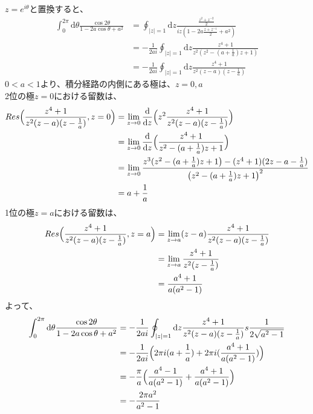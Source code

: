 \documentclass[dvipdfmx,a4paper]{jsarticle}
\begin{document}
\subsection{}
$z = e^{i\theta}$と置換すると、
\begin{align*}
\int_0^{2\pi}\mathrm{d}\theta \frac{\cos{2\theta}}{1-2a\cos{\theta}+a^2} &= \oint_{|z|=1}\mathrm{d}z\frac{\frac{z^2+z^{-2}}{2}}{iz(1-2a\frac{z + z^{-1}}{2}+a^2)}\\
&= -\frac{1}{2ai}\oint_{|z|=1}\mathrm{d}z\frac{z^4+1}{z^2(z^2 - (a + \frac{1}{a})z +1)}\\
&= -\frac{1}{2ai}\oint_{|z|=1}\mathrm{d}z\frac{z^4+1}{z^2(z-a)(z-\frac{1}{a})}
\end{align*}
$0<a<1$より、積分経路の内側にある極は、$z = 0,a$\\
2位の極$z = 0$における留数は、
\begin{align*}
Res\Bigl(\frac{z^4+1}{z^2(z-a)(z-\frac{1}{a})}, z = 0\Bigr) &= \lim_{z \to 0}\frac{\mathrm{d}}{\mathrm{d}z}\Bigl(z^2\frac{z^4+1}{z^2(z-a)(z-\frac{1}{a})}\Bigr)\\
&= \lim_{z \to 0}\frac{\mathrm{d}}{\mathrm{d}z}\Bigl(\frac{z^4+1}{z^2 - (a + \frac{1}{a})z +1}\Bigr)\\
&= \lim_{z \to 0}\frac{z^3(z^2 - (a + \frac{1}{a})z +1\bigr) - (z^4+1)(2z - a - \frac{1}{a})}{\bigl(z^2 - (a + \frac{1}{a})z +1\bigr)^2}\\
&= a + \frac{1}{a}
\end{align*}
1位の極$z = a$における留数は、
\begin{align*}
Res\Bigl(\frac{z^4+1}{z^2(z-a)(z-\frac{1}{a})}, z = a\Bigr) &= \lim_{z \to a}(z-a)\frac{z^4+1}{z^2(z-a)(z-\frac{1}{a})}\\
&= \lim_{z \to a}\frac{z^4+1}{z^2(z-\frac{1}{a})}\\
&= \frac{a^4+1}{a(a^2-1)}
\end{align*}
よって、
\begin{align*}
\int_0^{2\pi}\mathrm{d}\theta \frac{\cos{2\theta}}{1-2a\cos{\theta}+a^2} &= -\frac{1}{2ai}\oint_{|z|=1}\mathrm{d}z\frac{z^4+1}{z^2(z-a)(z-\frac{1}{a})}s\frac{1}{2\sqrt{a^2 -1}}\\
&=-\frac{1}{2ai}\Bigl(2\pi i(a + \frac{1}{a}) +2\pi i (\frac{a^4+1}{a(a^2-1)})\Bigr)\\
&=-\frac{\pi}{a}\Bigl(\frac{a^4-1}{a(a^2-1)} + \frac{a^4+1}{a(a^2-1)}\Bigr)\\
&=-\frac{2\pi a^2}{a^2-1}
\end{align*}
\\\\
\end{document}
